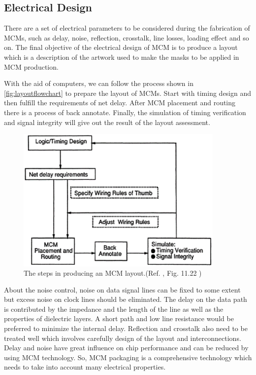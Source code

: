 \begin{spacing}{1.5}
\section{Electrical Design}

There are a set of electrical parameters to be considered during the fabrication of MCMs, such as delay, noise, reflection, crosstalk, line losses, loading effect and so on. The final objective of the electrical design of MCM is to produce a layout which is a description of the artwork used to make the masks to be applied in MCM production.\cite{Doane1993MultichipMT}

With the aid of computers, we can follow the process shown in \autoref{fig:layoutflowchart} to prepare the layout of MCMs. Start with timing design and then fulfill the requirements of net delay. After MCM placement and routing there is a process of back annotate. Finally, the simulation of timing verification and signal integrity will give out the result of the layout assessment.
\newpage
\begin{figure}[ht]
	\centering
	\includegraphics[width=4in, fbox]{Chapter1/layout_flow.eps}
	\caption{The steps in producing an MCM layout.(Ref. \cite{Doane1993MultichipMT}, Fig. 11.22 )}
	\label{fig:layoutflowchart} 
\end{figure}

About the noise control, noise on data signal lines can be fixed to some extent but excess noise on clock lines should be eliminated. The delay on the data path is contributed by the impedance and the length of the line as well as the properties of dielectric layers. A short path and low line resistance would be preferred to minimize the internal delay. Reflection and crosstalk also need to be treated well which involves carefully design of the layout and interconnections. Delay and noise have great influence on chip performance and can be reduced by using MCM technology. So, MCM packaging is a comprehensive technology which needs to take into account many electrical properties. 



\end{spacing}
\newpage


